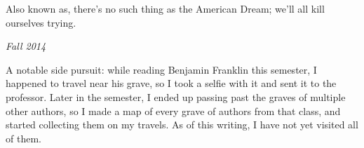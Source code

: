 Also known as, there's no such thing as the American Dream; we'll all kill
ourselves trying.

\begin{flushright}
\textit{Fall 2014}
\end{flushright}

A notable side pursuit: while reading Benjamin Franklin this semester, I
happened to travel near his grave, so I took a selfie with it and sent it to the
professor. Later in the semester, I ended up passing past the graves of
multiple other authors, so I made a map of every grave of authors from that
class, and started collecting them on my travels. As of this writing, I have not
yet visited all of them.





\groupendnotes

